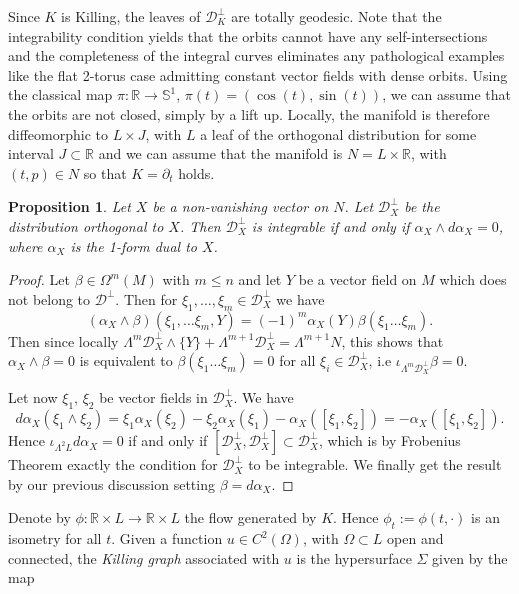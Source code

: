 \documentclass[12pt]{article}
\newtheorem{proposition}[lemma]{Proposition}
\numberwithin{lemma}{section}
\newcommand{\R}{\mathbb{R}}
\begin{document}
Since $K$ is Killing, the leaves of $\mathcal{D}_K^{\perp}$ are totally geodesic. Note that the integrability condition yields that the orbits cannot have any  self-intersections and the completeness of the integral curves eliminates any pathological examples like the flat 2-torus case admitting constant vector fields with dense orbits. Using the classical map $\pi:\R\rightarrow \mathbb{S}^1$, $\pi(t)=(\cos(t),\sin(t))$, we can assume that the orbits are not closed, simply by a lift up. Locally, the manifold is therefore diffeomorphic to $L\times J$, with $L$ a leaf of the orthogonal distribution for some interval $J\subset\R$ and we can assume that the manifold is $N=L\times\R$, with $(t,p)\in N$ so that  $K=\partial_t$ holds.

\begin{proposition}\label{orthogonal_dis_int} Let $X$ be a non-vanishing vector on $N$. Let $\mathcal{D}^{\perp}_X$ be the distribution orthogonal to $X$. Then $\mathcal{D}^{\perp}_X$ is integrable if and only if $\alpha_X\wedge d\alpha_X=0$, where $\alpha_X$ is the 1-form dual to $X$.
\end{proposition}
\begin{proof} Let $\beta\in\Omega^m(M)$ with $m\leq n$ and let $Y$ be a vector field on $M$ which does not belong to $\mathcal{D}^{\perp}$. Then for $\xi_1,\dots, \xi_m\in \mathcal{D}^{\perp}_X$ we have
\[(\alpha_X\wedge\beta)(\xi_1,\dots \xi_m,Y)=(-1)^m\alpha_X(Y)\beta(\xi_1\dots \xi_m).\]
Then since locally $\Lambda^m\mathcal{D}^{\perp}_X\wedge \{Y\}+\Lambda^{m+1}\mathcal{D}^{\perp}_X=\Lambda^{m+1}N$, this shows that  $\alpha_X\wedge\beta=0$ is equivalent to $\beta(\xi_1\dots \xi_m)=0$ for all $\xi_i\in \mathcal{D}^{\perp}_X$, i.e $\iota_{\Lambda^m\mathcal{D}^{\perp}_X}\beta=0$. 

Let now $\xi_1,\,\xi_2$ be vector fields in $\mathcal{D}^{\perp}_X$. We have
\[d\alpha_X(\xi_1\wedge\xi_2)=\xi_1\alpha_X(\xi_2)-\xi_2\alpha_X(\xi_1)-\alpha_X([\xi_1,\xi_2])=-\alpha_X([\xi_1,\xi_2]).\]
Hence $\iota_{\Lambda^2L}d\alpha_X=0$ if and only if $[\mathcal{D}^{\perp}_X,\mathcal{D}^{\perp}_X]
\subset\mathcal{D}^{\perp}_X$, which is by Frobenius Theorem exactly the condition for  $\mathcal{D}^{\perp}_X$ to be integrable. We finally get the result by our previous discussion setting $\beta= d\alpha_X$. 
\end{proof}
Denote by $\phi:\mathbb{R}\times L\rightarrow \mathbb{R}\times L$ the flow generated by $K$. Hence $\phi_t:=\phi(t,\cdot)$ is an isometry for all $t$. Given a function $u\in C^2(\Omega)$, with $\Omega\subset L$ open and connected, the \textit{Killing graph} associated with $u$ is the hypersurface $\Sigma$ given by the map 
\end{document}
